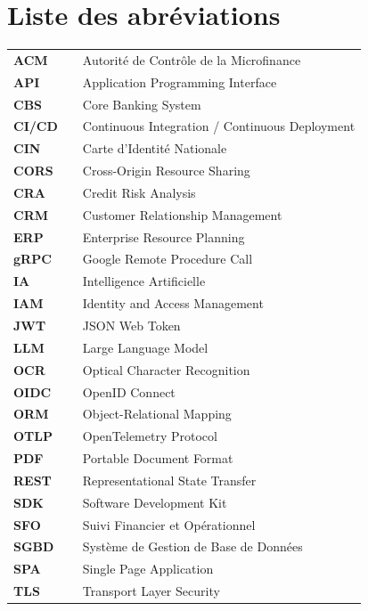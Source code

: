 \chapter*{Liste des abréviations}

\begingroup
\renewcommand{\arraystretch}{1.4}
\begin{tabular}{@{}p{2cm} @{} p{0.2cm} @{} p{11cm}@{}}
    \textbf{ACM}   & & Autorité de Contrôle de la Microfinance \\
    \textbf{API}   & & Application Programming Interface \\
    \textbf{CBS}   & & Core Banking System \\
    \textbf{CI/CD} & & Continuous Integration / Continuous Deployment \\
    \textbf{CIN}   & & Carte d'Identité Nationale \\
    \textbf{CORS}  & & Cross-Origin Resource Sharing \\
    \textbf{CRA}   & & Credit Risk Analysis \\
    \textbf{CRM}   & & Customer Relationship Management \\
    \textbf{ERP}   & & Enterprise Resource Planning \\
    \textbf{gRPC}  & & Google Remote Procedure Call \\
    \textbf{IA}    & & Intelligence Artificielle \\
    \textbf{IAM}   & & Identity and Access Management \\
    \textbf{JWT}   & & JSON Web Token \\
    \textbf{LLM}   & & Large Language Model \\
    \textbf{OCR}   & & Optical Character Recognition \\
    \textbf{OIDC}  & & OpenID Connect \\
    \textbf{ORM}   & & Object-Relational Mapping \\
    \textbf{OTLP}  & & OpenTelemetry Protocol \\
    \textbf{PDF}   & & Portable Document Format \\
    \textbf{REST}  & & Representational State Transfer \\
    \textbf{SDK}   & & Software Development Kit \\
    \textbf{SFO}   & & Suivi Financier et Opérationnel \\
    \textbf{SGBD}  & & Système de Gestion de Base de Données \\
    \textbf{SPA}   & & Single Page Application \\
    \textbf{TLS}   & & Transport Layer Security \\
\end{tabular}
\endgroup
